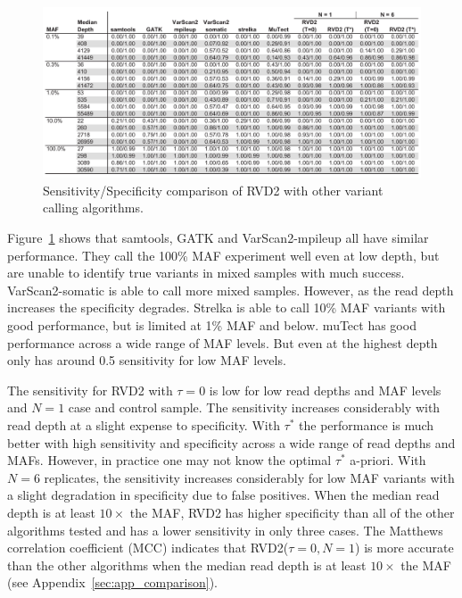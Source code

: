\documentclass[11pt,reqno]{amsart}
\begin{document}
\begin{figure}[h]
\begin{center}
\includegraphics[width=160mm]{pdf_figs/comparison_table_ss.pdf}
\caption{Sensitivity/Specificity comparison of RVD2 with other variant calling algorithms.}
\label{tbl:comparison_ss}
\end{center}
\end{figure}

Figure~\ref{tbl:comparison_ss} shows that samtools, GATK and VarScan2-mpileup all have similar performance. They call the 100\% MAF experiment well even at low depth, but are unable to identify true variants in mixed samples with much success. VarScan2-somatic is able to call more mixed samples. However, as the read depth increases the specificity degrades. Strelka is able to call 10\% MAF variants with good performance, but is limited at 1\% MAF and below. muTect has good performance across a wide range of MAF levels. But even at the highest depth only has around 0.5 sensitivity for low MAF levels.

The sensitivity for RVD2 with $\tau=0$ is low for low read depths and MAF levels and $N=1$ case and control sample. The sensitivity increases considerably with read depth at a slight expense to specificity. With $\tau^*$ the performance is much better with high sensitivity and specificity across a wide range of read depths and MAFs. However, in practice one may not know the optimal $\tau^*$ a-priori. With $N=6$ replicates, the sensitivity increases considerably for low MAF variants with a slight degradation in specificity due to false positives. When the median read depth is at least $10\times$ the MAF, RVD2 has higher specificity than all of the other algorithms tested and has a lower sensitivity in only three cases. The Matthews correlation coefficient (MCC) indicates that RVD2($\tau=0, N=1$) is more accurate than the other algorithms when the median read depth is at least $10\times$ the MAF (see Appendix~\ref{sec:app_comparison}).
\end{document}
